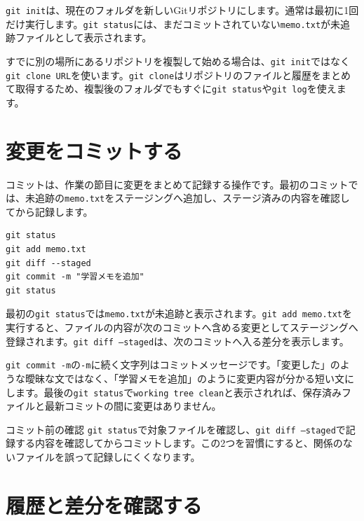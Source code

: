 \texttt{git init}は、現在のフォルダを新しいGitリポジトリにします。通常は最初に1回だけ実行します。\texttt{git status}には、まだコミットされていない\texttt{memo.txt}が未追跡ファイルとして表示されます。

すでに別の場所にあるリポジトリを複製して始める場合は、\texttt{git init}ではなく\texttt{git clone URL}を使います。\texttt{git clone}はリポジトリのファイルと履歴をまとめて取得するため、複製後のフォルダでもすぐに\texttt{git status}や\texttt{git log}を使えます。

\section{変更をコミットする}

コミットは、作業の節目に変更をまとめて記録する操作です。最初のコミットでは、未追跡の\texttt{memo.txt}をステージングへ追加し、ステージ済みの内容を確認してから記録します。

\begin{listing}[htbp]
\begin{verbatim}
git status
git add memo.txt
git diff --staged
git commit -m "学習メモを追加"
git status
\end{verbatim}
\caption{\texttt{memo.txt}を最初にコミットするコマンド}
\label{lst:appendix-git-first-commit}
\end{listing}

最初の\texttt{git status}では\texttt{memo.txt}が未追跡と表示されます。\texttt{git add memo.txt}を実行すると、ファイルの内容が次のコミットへ含める変更としてステージングへ登録されます。\texttt{git diff --staged}は、次のコミットへ入る差分を表示します。

\texttt{git commit -m}の\texttt{-m}に続く文字列はコミットメッセージです。「変更した」のような曖昧な文ではなく、「学習メモを追加」のように変更内容が分かる短い文にします。最後の\texttt{git status}で\texttt{working tree clean}と表示されれば、保存済みファイルと最新コミットの間に変更はありません。

\begin{pointbox}{コミット前の確認}
\texttt{git status}で対象ファイルを確認し、\texttt{git diff --staged}で記録する内容を確認してからコミットします。この2つを習慣にすると、関係のないファイルを誤って記録しにくくなります。
\end{pointbox}

\section{履歴と差分を確認する}

